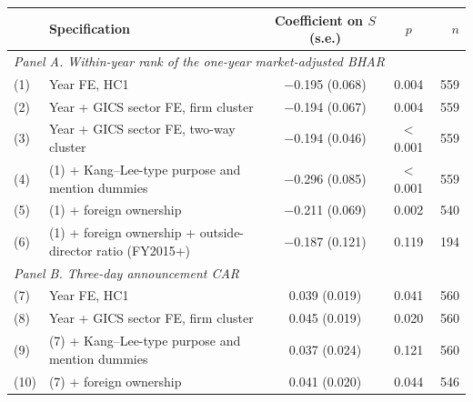 \begin{tabular}{l>{\raggedright\arraybackslash}p{7.2cm}ccr}
\toprule
 & Specification & Coefficient on $S$ (s.e.) & $p$ & $n$ \\
\midrule
\multicolumn{5}{l}{\emph{Panel A. Within-year rank of the one-year market-adjusted BHAR}} \\
(1) & Year FE, HC1 & $-$0.195 (0.068) & 0.004 & 559 \\
(2) & Year + GICS sector FE, firm cluster & $-$0.194 (0.067) & 0.004 & 559 \\
(3) & Year + GICS sector FE, two-way cluster & $-$0.194 (0.046) & $<$0.001 & 559 \\
(4) & (1) + Kang--Lee-type purpose and mention dummies & $-$0.296 (0.085) & $<$0.001 & 559 \\
(5) & (1) + foreign ownership & $-$0.211 (0.069) & 0.002 & 540 \\
(6) & (1) + foreign ownership + outside-director ratio (FY2015+) & $-$0.187 (0.121) & 0.119 & 194 \\
\midrule
\multicolumn{5}{l}{\emph{Panel B. Three-day announcement CAR}} \\
(7) & Year FE, HC1 & 0.039 (0.019) & 0.041 & 560 \\
(8) & Year + GICS sector FE, firm cluster & 0.045 (0.019) & 0.020 & 560 \\
(9) & (7) + Kang--Lee-type purpose and mention dummies & 0.037 (0.024) & 0.121 & 560 \\
(10) & (7) + foreign ownership & 0.041 (0.020) & 0.044 & 546 \\
\bottomrule
\end{tabular}

